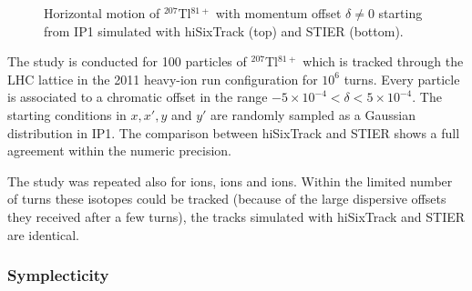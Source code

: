 \begin{figure}[b]
  \centering
  \caption{Horizontal motion of $^{207}$Tl$^{81+}$ with momentum offset $\delta \neq 0$ starting from IP1 simulated with hiSixTrack (top) and STIER (bottom).}  
  \label{pic:16070801} %
  \end{figure}
\newpage
The study is conducted for 100 particles of $^{207}$Tl$^{81+}$ which is tracked through the LHC lattice in the 2011 heavy-ion run configuration for $10^6$ turns. Every particle is associated to a chromatic offset in the range \mbox{$-5\times 10^{-4} < \delta < 5 \times 10^{-4}$}. The starting conditions in $x,x',y$ and $y'$ are randomly sampled as a Gaussian distribution in IP1. The comparison between hiSixTrack and STIER shows a full agreement within the numeric precision.  

The study was repeated also for  ions,  ions and  ions. Within the limited number of turns these isotopes could be tracked (because of the large dispersive offsets they received after a few turns), the tracks simulated with hiSixTrack and STIER are identical.




\subsubsection{Symplecticity}




